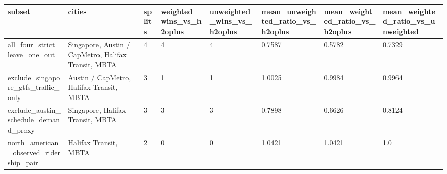 \begin{tabular}{llllllll}
\toprule
subset & cities & splits & weighted\_wins\_vs\_h2oplus & unweighted\_wins\_vs\_h2oplus & mean\_unweighted\_ratio\_vs\_h2oplus & mean\_weighted\_ratio\_vs\_h2oplus & mean\_weighted\_ratio\_vs\_unweighted \\
\midrule
all\_four\_strict\_leave\_one\_out & Singapore, Austin / CapMetro, Halifax Transit, MBTA & 4 & 4 & 4 & 0.7587 & 0.5782 & 0.7329 \\
exclude\_singapore\_gtfs\_traffic\_only & Austin / CapMetro, Halifax Transit, MBTA & 3 & 1 & 1 & 1.0025 & 0.9984 & 0.9964 \\
exclude\_austin\_schedule\_demand\_proxy & Singapore, Halifax Transit, MBTA & 3 & 3 & 3 & 0.7898 & 0.6626 & 0.8124 \\
north\_american\_observed\_ridership\_pair & Halifax Transit, MBTA & 2 & 0 & 0 & 1.0421 & 1.0421 & 1.0 \\
\bottomrule
\end{tabular}
